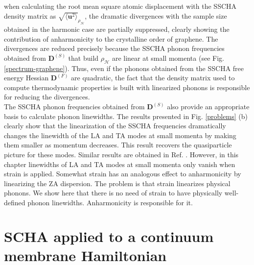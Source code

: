 when calculating the root mean square atomic displacement with the SSCHA density matrix as 
$\sqrt{\langle \mathbf{u}^2 \rangle}_{\rho_{\mathcal{H}}}$, the dramatic divergences with the sample size obtained 
in the harmonic case are partially suppressed, clearly showing the contribution of anharmonicity to the crystalline 
order of graphene. The divergences are reduced precisely because the SSCHA phonon frequencies obtained from 
$\boldsymbol{D}^{(S)}$ that build $\rho_{\mathcal{H}}$ are linear at small momenta (see 
Fig. \ref{spectrum-graphene}). Thus, even if the phonons obtained from the SSCHA free energy Hessian 
$\boldsymbol{D}^{(F)}$ are quadratic, the fact that the density matrix used to compute thermodynamic properties is 
built with linearized phonons is responsible for reducing the divergences. \\

The SSCHA phonon frequencies obtained from $\boldsymbol{D}^{(S)}$ also provide an appropriate basis to calculate 
phonon linewidths\cite{bianco2017second,aseginolaza2019phonon}. The results presented in Fig. \ref{problems} (b) 
clearly show that the linearization of the SSCHA frequencies dramatically changes the linewidth of the LA and TA 
modes at small momenta by making them smaller as momentum decreases. This result recovers the quasiparticle picture 
for these modes. Similar results are obtained in Ref. \cite{bonini2012acoustic}. However, in this chapter linewidths 
of LA and TA modes at small momenta only vanish when strain is applied. Somewhat strain has an analogous effect to 
anharmonicity by linearizing the ZA dispersion. The problem is that strain linearizes physical phonons. We show here 
that there is no need of strain to have physically well-defined phonon linewidths. Anharmonicity is responsible for 
it. 

\section{SCHA applied to a continuum membrane Hamiltonian}
\label{membrane-model}


